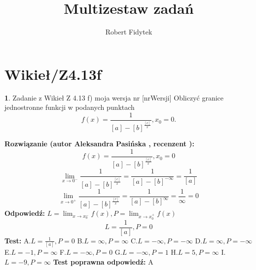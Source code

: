 \documentclass[12pt, a4paper]{article}
\title{Multizestaw zadań}
\author{Robert Fidytek}
\date{}
\theoremstyle{definition} %
\newtheorem{zad}{}
\newcommand{\kategoria}[1]{\section{#1}} %
\newcommand{\zadStart}[1]{\begin{zad}#1\newline} %
\newcommand{\zadStop}{\end{zad}}   %
\newcommand{\rozwStart}[2]{\noindent \textbf{Rozwiązanie (autor #1 , recenzent #2): }\newline} %
\newcommand{\rozwStop}{\newline}                                            %
\newcommand{\odpStart}{\noindent \textbf{Odpowiedź:}\newline}    %
\newcommand{\odpStop}{\newline}                                             %
\newcommand{\testStart}{\noindent \textbf{Test:}\newline} %
\newcommand{\testStop}{\newline} %
\newcommand{\kluczStart}{\noindent \textbf{Test poprawna odpowiedź:}\newline} %
\newcommand{\kluczStop}{\newline} %
\begin{document}
\maketitle


\kategoria{Wikieł/Z4.13f}
\zadStart{Zadanie z Wikieł Z 4.13 f) moja wersja nr [nrWersji]}
Obliczyć granice jednostronne funkcji w podanych punktach $$f(x)=\frac{1}{[a]-[b]^{\frac{[c]}{x}}},x_{0}=0.$$
\zadStop
\rozwStart{Aleksandra Pasińska}{}
$$f(x)=\frac{1}{[a]-[b]^{\frac{[c]}{x}}},x_{0}=0$$
$$\lim_{x\rightarrow 0^-}\frac{1}{[a]-[b]^{\frac{[c]}{x}}}=\frac{1}{[a]-[b]^{-\infty}}=\frac{1}{[a]}$$ 
$$\lim_{x\rightarrow 0^+}\frac{1}{[a]-[b]^{\frac{[c]}{x}}}=\frac{1}{[a]-[b]^{\infty}}=\frac{1}{\infty}=0$$ 
\rozwStop
\odpStart
$ L=\lim_{x\rightarrow x_{0}^-}f(x), P=\lim_{x\rightarrow x_{0}^+}f(x)$
$$L=\frac{1}{[a]}, P=0$$
\odpStop
\testStart
A.$ L=\frac{1}{[a]}, P=0 $
B.$L=\infty, P=\infty$
C.$L=-\infty, P=-\infty$
D.$L=\infty, P=-\infty$
E.$L=-1, P=\infty$
F.$L=-\infty, P=0$
G.$L=-\infty, P=1$
H.$L=5, P=\infty$
I.$L=-9, P=\infty$
\testStop
\kluczStart
A
\kluczStop
\end{document}
